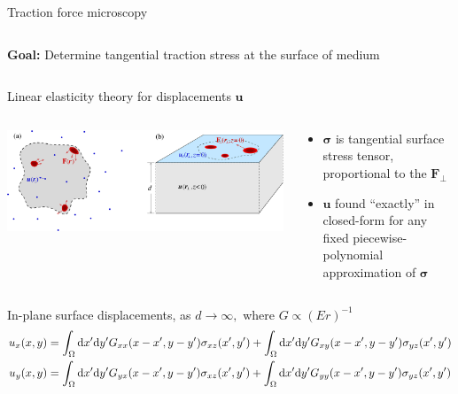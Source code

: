 \documentclass[presentation,aspectratio=169]{beamer}
\newcommand{\dd}{\mathrm{d}}
\newcommand{\bsigma}{\boldsymbol\sigma}
\begin{document}
\begin{frame}{Traction force microscopy}
\begin{columns}
\begin{column}{0.55\textwidth}
\bigskip

\textbf{Goal:} Determine tangential traction stress at the surface of medium

\end{column}
\end{columns}
\end{frame}

\begin{frame}{Linear elasticity theory for displacements $\mathbf{u}$}
\begin{columns}
\begin{column}{0.65\textwidth}
\centering
\includegraphics[width=\textwidth]{figures/Fig1}
\end{column}
\begin{column}{0.35\textwidth}
\begin{itemize}
\item $\bsigma$ is tangential surface stress tensor, proportional to the $\mathbf{F}_\perp$
\item $\mathbf{u}$ found ``exactly'' in closed-form for any fixed piecewise-polynomial approximation of $\bsigma$
\end{itemize}
\end{column}
\end{columns}

\scriptsize

\begin{block}{In-plane surface displacements, as $d\to\infty,$ where $G \propto (Er)^{-1}$}
\vspace{-10pt}
\begin{align*}\tiny
u_{x}(x,y) &= \int_\Omega \dd x'\dd y'G_{xx}( x-x',y-y')\sigma_{xz}(x',y') 
 +  \int_\Omega \dd x'\dd y'G_{xy}( x-x',y-y')\sigma_{yz}(x',y')  \\
u_y(x,y) &= \int_\Omega \dd x'\dd y'G_{yx}( x-x',y-y')\sigma_{xz}(x',y') +  \int_\Omega \dd x'\dd y'G_{yy}( x-x',y-y')\sigma_{yz}(x',y') 
\end{align*}
\end{block}

\end{frame}
\end{document}
